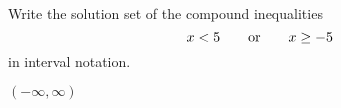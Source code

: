 

Write the solution set of the compound inequalities
\[x<5\text{\quad\quad or\quad\quad}  x\geq -5 \]
in interval notation.

\begin{solution}
$(-\infty, \infty)$
\end{solution}